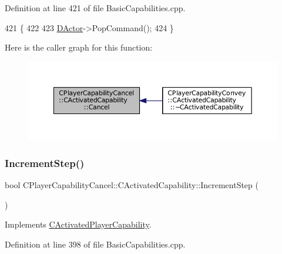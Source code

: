 Definition at line 421 of file Basic\+Capabilities.\+cpp.


\begin{DoxyCode}
421                                                         \{
422 
423     \hyperlink{classCActivatedPlayerCapability_a54ca944b47bff2718330639941d402b0}{DActor}->PopCommand();
424 \}
\end{DoxyCode}
Here is the caller graph for this function\+:
\nopagebreak
\begin{figure}[H]
\begin{center}
\leavevmode
\includegraphics[width=350pt]{classCPlayerCapabilityCancel_1_1CActivatedCapability_accd67b449574b6c99e21f522d13bc96a_icgraph}
\end{center}
\end{figure}
\hypertarget{classCPlayerCapabilityCancel_1_1CActivatedCapability_a28351293b3a662bca20a2d666b8801e1}{}\label{classCPlayerCapabilityCancel_1_1CActivatedCapability_a28351293b3a662bca20a2d666b8801e1} 
\subsubsection{\texorpdfstring{Increment\+Step()}{IncrementStep()}}
{\footnotesize\ttfamily bool C\+Player\+Capability\+Cancel\+::\+C\+Activated\+Capability\+::\+Increment\+Step (\begin{DoxyParamCaption}{ }\end{DoxyParamCaption})\hspace{0.3cm}{\ttfamily [virtual]}}



Implements \hyperlink{classCActivatedPlayerCapability_a943b5999a57504399293250382c0ec6a}{C\+Activated\+Player\+Capability}.



Definition at line 398 of file Basic\+Capabilities.\+cpp.


